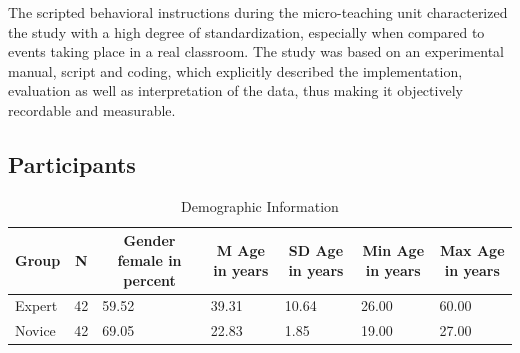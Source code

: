 \documentclass[
  man]{apa6}
\begin{document}
The scripted behavioral instructions during the micro-teaching unit characterized the study with a high degree of standardization, especially when compared to events taking place in a real classroom. The study was based on an experimental manual, script and coding, which explicitly described the implementation, evaluation as well as interpretation of the data, thus making it objectively recordable and measurable.

\subsection{Participants}\label{participants}

\begin{table}[h]

\begin{center}
\begin{threeparttable}

\caption{\label{tab:demographicstable}Demographic Information}

\tiny{

\begin{tabular}{lllllll}
\toprule
Group & \multicolumn{1}{c}{N} & \multicolumn{1}{c}{Gender female in percent} & \multicolumn{1}{c}{M Age in years} & \multicolumn{1}{c}{SD Age in years} & \multicolumn{1}{c}{Min Age in years} & \multicolumn{1}{c}{Max Age in years}\\
\midrule
Expert & 42 & 59.52 & 39.31 & 10.64 & 26.00 & 60.00\\
Novice & 42 & 69.05 & 22.83 & 1.85 & 19.00 & 27.00\\
\bottomrule
\end{tabular}

}

\end{threeparttable}
\end{center}

\end{table}
\end{document}

